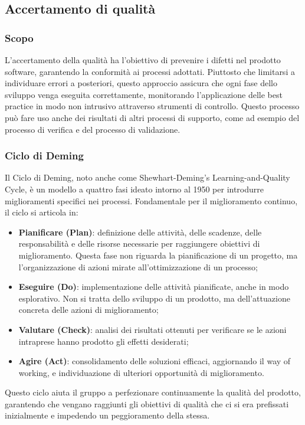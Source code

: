 \subsection{Accertamento di qualità}
\subsubsection{Scopo}
L'accertamento della qualità ha l'obiettivo di prevenire i difetti nel prodotto software, garantendo la conformità ai processi adottati. Piuttosto che limitarsi a individuare errori a posteriori, questo approccio assicura che ogni fase dello sviluppo venga eseguita correttamente, monitorando l’applicazione delle best practice in modo non intrusivo attraverso strumenti di controllo. Questo processo può fare uso anche dei risultati di altri processi di supporto, come ad esempio del processo di verifica e del processo di validazione.

\subsubsection{Ciclo di Deming}
Il Ciclo di Deming, noto anche come Shewhart-Deming’s Learning-and-Quality Cycle, è un modello a quattro fasi ideato intorno al 1950 per introdurre miglioramenti specifici nei processi. Fondamentale per il miglioramento continuo, il ciclo si articola in:  
\begin{itemize}
    \item \textbf{Pianificare (Plan)}: definizione delle attività, delle scadenze, delle responsabilità e delle risorse necessarie per raggiungere obiettivi di miglioramento. Questa fase non riguarda la pianificazione di un progetto, ma l’organizzazione di azioni mirate all’ottimizzazione di un processo;
    \item \textbf{Eseguire (Do)}: implementazione delle attività pianificate, anche in modo esplorativo. Non si tratta dello sviluppo di un prodotto, ma dell’attuazione concreta delle azioni di miglioramento;
    \item \textbf{Valutare (Check)}: analisi dei risultati ottenuti per verificare se le azioni intraprese hanno prodotto gli effetti desiderati;
    \item \textbf{Agire (Act)}: consolidamento delle soluzioni efficaci, aggiornando il way of working, e individuazione di ulteriori opportunità di miglioramento.
\end{itemize}
Questo ciclo aiuta il gruppo a perfezionare continuamente la qualità del prodotto, garantendo che vengano raggiunti gli obiettivi di qualità che ci si era prefissati inizialmente e impedendo un peggioramento della stessa.


